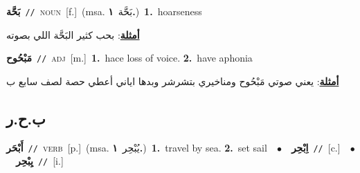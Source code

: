 \documentclass[10pt,a4paper,twoside]{article} %
\begin{document}
\begin{multicols}{2}
{\setlength\topsep{0pt}\textbf{\foreignlanguage{arabic}{بَحَّة}}\ {\color{gray}\texttt{//}\color{black}}\ \textsc{noun}\ [f.]\ \color{gray}(msa. \foreignlanguage{arabic}{بَحَّة}~\foreignlanguage{arabic}{\textbf{١.}})\color{black}\ \textbf{1.}~hoarseness\  \begin{flushright}\color{gray}\foreignlanguage{arabic}{\textbf{\underline{\foreignlanguage{arabic}{أمثلة}}}: بحب كثير البَحَّة اللي بصوته}\end{flushright}\color{black}} \vspace{2mm}

{\setlength\topsep{0pt}\textbf{\foreignlanguage{arabic}{مَبْحُوح}}\ {\color{gray}\texttt{//}\color{black}}\ \textsc{adj}\ [m.]\ \textbf{1.}~hace loss of voice.  \textbf{2.}~have aphonia\  \begin{flushright}\color{gray}\foreignlanguage{arabic}{\textbf{\underline{\foreignlanguage{arabic}{أمثلة}}}: يعني صوتي مَبْحُوح ومناخيري بتشرشر وبدها اياني أعطي حصة لصف سابع ب}\end{flushright}\color{black}} \vspace{2mm}

\vspace{-3mm}
\subsection*{\color{blue}\foreignlanguage{arabic}{ب.ح.ر}\color{blue}{}} 

{\setlength\topsep{0pt}\textbf{\foreignlanguage{arabic}{أَبْحَر}}\ {\color{gray}\texttt{//}\color{black}}\ \textsc{verb}\ [p.]\ \color{gray}(msa. \foreignlanguage{arabic}{يُبْحِر}~\foreignlanguage{arabic}{\textbf{١.}})\color{black}\ \textbf{1.}~travel by sea.  \textbf{2.}~set sail\ \ $\bullet$\ \ \setlength\topsep{0pt}\textbf{\foreignlanguage{arabic}{اِبْحِر}}\ {\color{gray}\texttt{//}\color{black}}\ [c.]\ \ $\bullet$\ \ \setlength\topsep{0pt}\textbf{\foreignlanguage{arabic}{يِبْحِر}}\ {\color{gray}\texttt{//}\color{black}}\ [i.]\ } \vspace{2mm}


\end{multicols}
\end{document}
